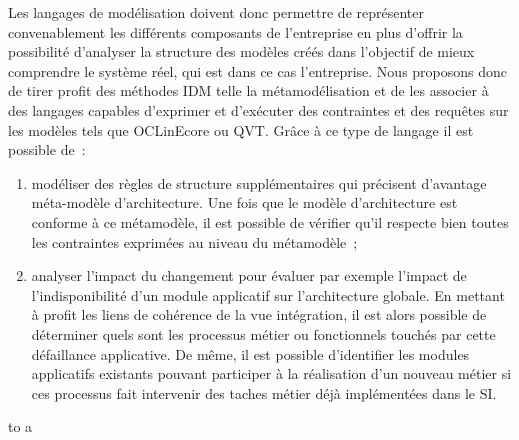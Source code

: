 Les langages de modélisation doivent donc permettre de représenter 
convenablement les différents composants de l'entreprise en plus d'offrir la 
possibilité d'analyser la structure des modèles créés dans l'objectif de mieux 
comprendre le système réel, qui est dans ce cas l'entreprise. Nous proposons 
donc de tirer profit des méthodes IDM telle la métamodélisation et de les 
associer à des langages capables d'exprimer et d'exécuter des contraintes et des 
requêtes sur les modèles tels que OCLinEcore ou QVT. Grâce à ce type de langage 
il est possible de~:
\begin{enumerate}
\item modéliser des règles de structure supplémentaires qui précisent d'avantage 
méta-modèle d'architecture. Une fois que le modèle d'architecture est conforme à 
ce métamodèle, il est possible de vérifier qu'il respecte bien toutes les 
contraintes exprimées au niveau du métamodèle~;
\item analyser l'impact du changement pour évaluer par exemple l'impact de 
l'indisponibilité d'un module applicatif sur l'architecture globale. En mettant 
à profit les liens de cohérence de la vue intégration, il est alors possible de 
déterminer quels sont les processus métier ou fonctionnels touchés par cette 
défaillance applicative. De même, il est possible d'identifier les modules 
applicatifs existants pouvant participer à la réalisation d'un nouveau métier si 
ces processus fait intervenir des taches métier déjà implémentées dans le SI.
\end{enumerate}




 
%
to 
a 
%

